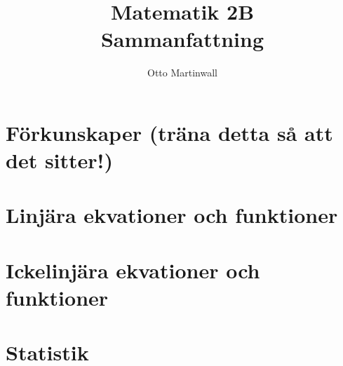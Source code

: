 
\usepackage[swedish]{babel}

\title{Matematik 2B \\ Sammanfattning}
\author{Otto Martinwall}


\maketitle
\tableofcontents
\newpage

\newtheorem{definition}{Definition}
\newtheorem{theorem}{Theorem}

\section{Förkunskaper (träna detta så att det sitter!)}


\section{Linjära ekvationer och funktioner}


\section{Ickelinjära ekvationer och funktioner}


\section{Statistik}


